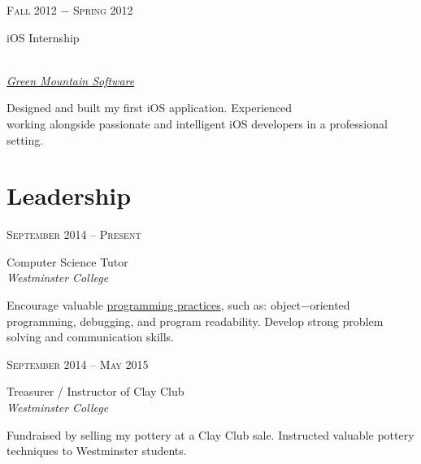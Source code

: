 \documentclass[10pt]{article} %
\begin{document}
{{{{%

{\raggedleft\textsc{Fall 2012 $-$ Spring 2012}\par}

{\raggedright\large iOS Internship} \\
\textit{\href{http://greenmountainsoftware.com/} {Green Mountain Software}}} \newline

\normalsize{Designed and built my first iOS application. Experienced \\ working alongside passionate and intelligent iOS developers in a professional setting.} 

\section*{Leadership} 


{\raggedleft\textsc{September 2014 -- Present}\par}

{\raggedright\large Computer Science Tutor\\
\textit{Westminster College}\\[5pt]}

Encourage valuable \href{https://github.com/aidanmelen/Westminster_tutoring/blob/master/hangman/hangman.java} {programming practices}, such as: object$-$oriented programming, debugging, and program readability.  Develop strong problem solving and communication skills. \\


{\raggedleft\textsc{September 2014 -- May 2015}\par}

{\raggedright\large Treasurer / Instructor of Clay Club \\
\textit{Westminster College}\\[5pt]}

\normalsize{Fundraised by selling my pottery at a Clay Club sale. Instructed valuable pottery techniques to Westminster students.} \\

}}}
\end{document}
